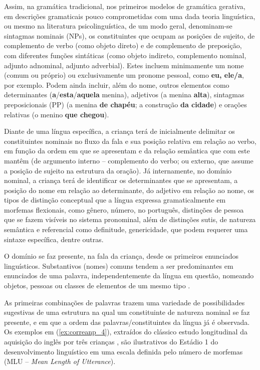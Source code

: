 \documentclass[output=paper]{LSP/langsci}
\begin{document}
Assim, na gramática tradicional, nos primeiros modelos de gramática gerativa,  em descrições gramaticais pouco comprometidas com uma dada teoria linguística, ou mesmo na literatura psicolinguística, de um modo geral, denominam-se sintagmas nominais (NPs), os constituintes que ocupam as posições de sujeito, de complemento de verbo (como objeto direto) e de complemento de preposição, com diferentes funções sintáticas (como objeto indireto, complemento nominal, adjunto adnominal, adjunto adverbial). Estes incluem minimamente um nome (comum ou próprio) ou exclusivamente um pronome pessoal, como \textbf{eu, ele/a}, por exemplo. Podem ainda incluir, além do nome, outros elementos como determinantes (\textbf{a}/\textbf{esta}/\textbf{aquela} menina), adjetivos (a menina \textbf{alta}), sintagmas preposicionais (PP) (a menina \textbf{de chapéu}; a construção \textbf{da cidade}) e orações relativas (o menino \textbf{que chegou}). 

  Diante de uma língua específica, a criança terá de inicialmente delimitar os constituintes nominais no fluxo da fala e sua posição relativa em relação ao verbo, em função da ordem em que se apresentam e da relação semântica que com este mantêm (de argumento interno -- complemento do verbo; ou externo, que assume a posição de sujeito na estrutura da oração). Já internamente, no domínio nominal, a criança terá de identificar os determinantes que se apresentam, a posição do nome em relação ao determinante, do adjetivo em relação ao nome, os tipos de distinção conceptual que a língua expressa gramaticalmente em morfemas flexionais, como gênero, número, no português, distinções de pessoa que se fazem visíveis no sistema pronominal, além de distinções sutis, de natureza semântica e referencial como definitude, genericidade, que podem requerer uma sintaxe específica, dentre outras.
  
O domínio  se faz presente, na fala da criança, desde os primeiros enunciados linguísticos. Substantivos (nomes) comuns tendem a ser predominantes em enunciados de uma palavra, independentemente da língua em questão, nomeando objetos, pessoas ou classes de elementos de um mesmo tipo \citep{gentnerboroditsky2001}.

As primeiras combinações de palavras trazem uma variedade de possibilidades sugestivas de uma estrutura na qual um constituinte de natureza nominal se faz presente, e em que a ordem das palavras/constituintes da língua já é observada. Os exemplos em (\ref{ex:correanp_4}), extraídos do clássico estudo longitudinal da aquisição do inglês por três crianças \citep{brown1973}, são ilustrativos do Estádio 1 do desenvolvimento linguístico em uma escala definida pelo número de morfemas (MLU – \textit{Mean Length of Utterance}).
\end{document}

